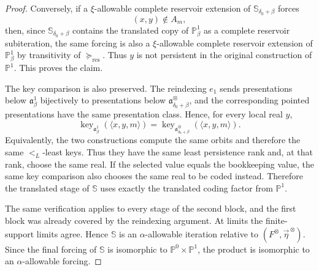 \documentclass[10pt,a4paper]{amsart}
\newcommand{\forceP}{\mathbb{P}}
\newcommand{\forceS}{\mathbb{S}}
\newcommand{\key}{\operatorname{key}}
\begin{document}
\begin{proof}
Conversely, if a $\xi$-allowable complete reservoir extension of
$\forceS_{\delta_0+\beta}$ forces
\[
   (x,y)\notin A_m,
\]
then, since $\forceS_{\delta_0+\beta}$ contains the translated copy of
$\forceP^1_\beta$ as a complete reservoir subiteration, the same forcing is
also a $\xi$-allowable complete reservoir extension of $\forceP^1_\beta$ by
transitivity of $\succeq_{\mathrm{res}}$.  Thus $y$ is not persistent in the
original construction of $\forceP^1$.  This proves the claim.

The key comparison is also preserved.  The reindexing $e_1$ sends presentations
below $\mathfrak a^1_\beta$ bijectively to presentations below
$\mathfrak a^\otimes_{\delta_0+\beta}$, and the corresponding pointed
presentations have the same presentation class.  Hence, for every local real
$y$,
\[
   \key_{\mathfrak a^1_\beta}
      (\langle x,y,m\rangle)
   =
   \key_{\mathfrak a^\otimes_{\delta_0+\beta}}
      (\langle x,y,m\rangle).
\]
Equivalently, the two constructions compute the same orbits and therefore the
same $<_L$-least keys.  Thus they have the same least persistence rank and,
at that rank, choose the same real.  If the selected value equals the
bookkeeping value, the same key comparison also chooses the same real to be
coded instead.  Therefore the translated stage of $\forceS$ uses exactly the
translated coding factor from $\forceP^1$.

The same verification applies to every stage of the second block, and the
first block was already covered by the reindexing argument.  At limits the
finite-support limits agree.  Hence $\forceS$ is an $\alpha$-allowable
iteration relative to $(F^\otimes,\vec\eta^{\,\otimes})$.  Since the final
forcing of $\forceS$ is isomorphic to $\forceP^0\times\forceP^1$, the product
is isomorphic to an $\alpha$-allowable forcing.
\end{proof}
\end{document}
